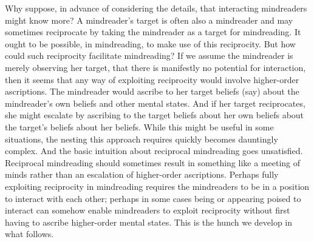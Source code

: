 \documentclass[12pt,\papersize]{extarticle}
\begin{document}
Why suppose, in advance of considering the details, that interacting mindreaders might know more?
A mindreader's target is often also a mindreader and may sometimes reciprocate by taking the mindreader as a target for mindreading.
It ought to be possible, in mindreading, to make use of this reciprocity.
But how could such reciprocity facilitate mindreading?
If we assume the mindreader is merely observing her target,
that there is manifestly no potential for interaction,
then it seems that any way of exploiting reciprocity would involve higher-order ascriptions. 
The mindreader would ascribe to her target beliefs (say) about the mindreader's own beliefs and other mental states.
And if her target reciprocates, she might escalate by ascribing to the target beliefs about her own beliefs about the target's beliefs about her beliefs.
While this might be useful in some situations, 
the nesting this approach requires quickly becomes dauntingly complex.
And the basic intuition about reciprocal mindreading goes unsatisfied.
Reciprocal mindreading should sometimes result in 
something like a meeting of minds
rather than
an escalation of higher-order ascriptions.
Perhaps fully exploiting reciprocity in mindreading
requires the mindreaders to be in a position to interact with each other;
perhaps in some cases 
being or appearing poised to interact
can somehow enable mindreaders to exploit reciprocity without first having to ascribe higher-order mental states.
This is the hunch we develop in what follows.
\end{document}
